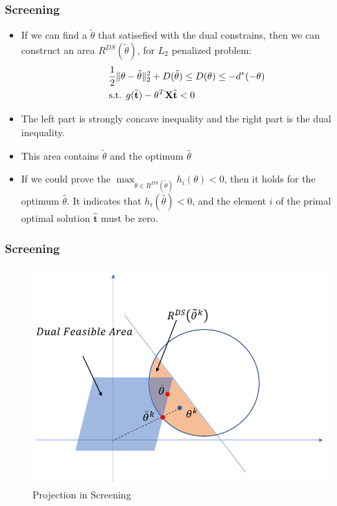\documentclass[dvipdfmx,cjk,t,10pt]{beamer}
\renewcommand{\vec}[1]{\mathbf{#1}}
\begin{document}
\begin{frame}
\frametitle{Screening}	
		\begin{itemize}
		\item If we can find a $\tilde{\theta}$ that satisefied with the dual constrains, then we can construct an area $R^{DS}(\tilde{\theta})$, for $L_2$ penalized problem:
\begin{equation}
\begin{split}
	&\frac{1}{2}\| \theta -\tilde{\theta}\|_2^{2} + D(\tilde{\theta}) \leq D(\theta) \leq -d^{*}(-\theta) \\
	& \text{s.t. } g(\tilde{\vec{t}})-\theta^{T}\mat{X}\tilde{\vec{t}}< 0
\end{split}
\end{equation}
		\item The left part is strongly concave inequality and the right part is the dual inequality. 
		\item This area contains $\tilde{\theta}$ and the optimum $\hat{\theta}$
		\item If we could prove the $\max_{\theta \in R^{DS}(\tilde{\theta}) } h_{i}(\theta)<0$, then it holds for the optimum $\hat{\theta}$. It indicates that $ h_{i}(\hat{\theta})<0$, and the element $i$ of the primal optimal solution $\hat{\vec{t}}$ must be zero. 
		\end{itemize}
\end{frame}


\begin{frame}
\frametitle{Screening}
	\begin{figure}[htbp]
	\begin{center}	
	\includegraphics[width=0.8\hsize]{pic/proj}
	\caption{Projection in Screening}
	\end{center}	
	\end{figure}	
\end{frame}
\end{document}
